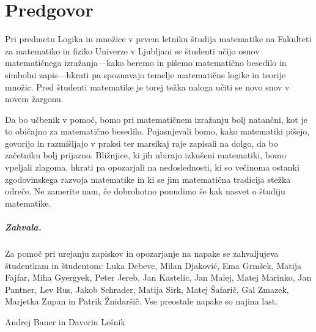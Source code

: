\chapter*{Predgovor}

Pri predmetu Logika in množice v prvem letniku študija matematike na Fakulteti za matematiko in fiziko Univerze v Ljubljani se študenti učijo osnov matematičnega izražanja---kako beremo in pišemo matematično besedilo in simbolni zapis---hkrati pa spoznavajo temelje matematične logike in teorije množic.
%
Pred študenti matematike je torej težka naloga učiti se novo snov v novem žargonu.

Da bo učbenik v pomoč, bomo pri matematičnem izražanju bolj natančni, kot je to običajno za matematično besedilo.
Pojasnjevali bomo, kako matematiki pišejo, govorijo in razmišljajo v praksi ter marsikaj raje zapisali na dolgo, da bo začetniku bolj prijazno.
%
Bližnjice, ki jih ubirajo izkušeni matematiki, bomo vpeljali zlagoma, hkrati pa opozarjali na nedoslednosti, ki so
večinoma ostanki zgodovinskega razvoja matematike in ki se jim matematična tradicija stežka odreče.
%
Ne zamerite nam, če dobrohotno ponudimo še kak nasvet o študiju matematike.


\paragraph{Zahvala.}
%
Za pomoč pri urejanju zapiskov in opozarjanje na napake se zahvaljujeva študentkam in študentom:
%
Luka Debevc,
Milan Djaković,
Ema Grmšek,
Matija Fajfar,
Miha Gyergyek,
Peter Jereb,
Jan Kastelic,
Jan Malej,
Matej Marinko,
Jan Pantner,
Lev Rus,
Jakob Schrader,
Matija Sirk,
Matej Šafarič,
Gal Zmazek,
Marjetka Zupan in Patrik Žnidaršič.
%
Vse preostale napake so najina last.
\bigskip

\begin{flushright}
Andrej Bauer in Davorin Lešnik
\end{flushright}

\bigskip


